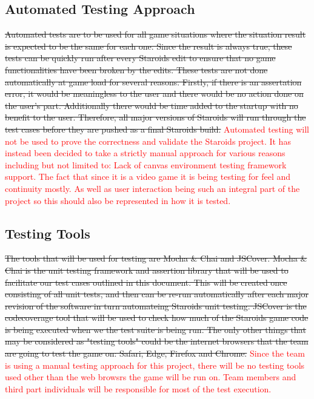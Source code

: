\documentclass[12pt, titlepage]{article}
\begin{document}
\subsection{Automated Testing Approach}
\sout{Automated tests are to be used for all game situations where the situation result is expected to be the same for each one. Since the result is always true, these tests can be quickly run after every Staroids edit to ensure that no game functionalities have been broken by the edits. These tests are not done automatically at game load for several reasons. Firstly, if there is an assertation error, it would be meaningless to the user and there would be no action done on the user's part. Additionally there would be time added to the startup with no benefit to the user. Therefore, all major versions of Staroids will run through the test cases before they are pushed as a final Staroids build.}
\textcolor{red}{Automated testing will not be used to prove the correctness and validate the Staroids project. It has instead been decided to take a strictly manual approach for various reasons including but not limited to: Lack of canvas environment testing framework support. The fact that since it is a video game it is being testing for feel and continuity mostly. As well as user interaction being such an integral part of the project so this should also be represented in how it is tested.}

\subsection{Testing Tools}
\sout{The tools that will be used for testing are Mocha \& Chai and JSCover. Mocha \& Chai is the unit testing framework and assertion library that will be used to facilitate our test cases outlined in this document. This will be created once consisting of all unit tests, and then can be re-run automatically after each major revision of the software in turn automateing Staroids unit testing. JSCover is the codecoverage tool that will be used to check how much of the Staroids game code is being executed when we the test suite is being run. The only other things that may be considered as "testing tools" could be the internet browsers that the team are going to test the game on: Safari, Edge, Firefox and Chrome.}
\textcolor{red}{Since the team is using a manual testing approach for this project, there will be no testing tools used other than the web browsrs the game will be run on. Team members and third part individuals will be responsible for most of the test execution.}
\end{document}
